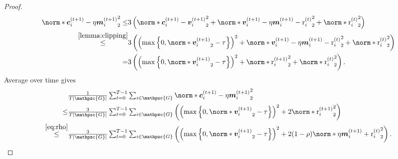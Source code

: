 \documentclass{article}
\newcommand{\gset}{\ensuremath{{\mathpzc{G}}}}
\begin{document}
\begin{proof}
  \begin{align*}
    \norm*{ \cc_i^{(t+1)}  - \eta \mm_i^{(t+1)}  }_2^2 \le &
    3\left(\norm*{ \cc_i^{(t+1)}  - \vv_i^{(t+1)}  }_2^2
    + \norm*{ \vv_i^{(t+1)}  - \eta \mm_i^{(t+1)} - \rr_i^{(t)}  }_2^2
    + \norm*{ \rr_i^{(t)} }_2^2
    \right)                                                  \\
    \stackrel{\Cref{lemma:clipping} }{\le}                 &
    3\left( \left(\max\left\{0, \norm*{\vv_i^{(t+1)}}_2-\tau\right\}\right)^2
    + \norm*{ \vv_i^{(t+1)}  - \eta \mm_i^{(t+1)} - \rr_i^{(t)}  }_2^2
    + \norm*{ \rr_i^{(t)} }_2^2 \right)                      \\
    =                                                      &
    3\left( \left(\max\left\{0, \norm*{\vv_i^{(t+1)}}_2-\tau\right\}\right)^2
    + \norm*{ \rr_i^{(t+1)}  }_2^2
    + \norm*{ \rr_i^{(t)} }_2^2 \right).
  \end{align*}
  Average over time gives
  \begin{align*}
                                   & \tfrac{1}{T|\gset|}\tsum_{t=0}^{T-1}\tsum_{i\in\gset}\norm*{ \cc_i^{(t+1)}  - \eta \mm_i^{(t+1)}  }_2^2 \\
    \le                            &
    \tfrac{3}{T|\gset|}\tsum_{t=0}^{T-1}\tsum_{i\in\gset}\left( \left(\max\left\{0, \norm*{\vv_i^{(t+1)}}_2-\tau\right\}\right)^2
    + 2 \norm*{ \rr_i^{(t+1)}  }_2^2\right)                                                                                                  \\
    \stackrel{\eqref{eq:rho}}{\le} &
    \tfrac{3}{T|\gset|}\tsum_{t=0}^{T-1}\tsum_{i\in\gset}\left( \left(\max\left\{0, \norm*{\vv_i^{(t+1)}}_2-\tau\right\}\right)^2
    + 2(1-\rho) \norm*{ \eta\mm_i^{(t+1)} + \rr_i^{(t)}  }_2^2\right).
  \end{align*}


\end{proof}
\end{document}

